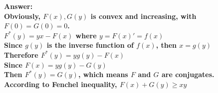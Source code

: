 \documentclass{article}
\theoremstyle{definition}
\theoremstyle{definition}
\theoremstyle{remark}
\begin{document}
{\bf{Answer:
\\Obviously, $F(x),G(y)$ is convex and increasing, with $F(0)=G(0)=0$.  
\\$F^*(y)=yx-F(x)$ where $y=F(x)'=f(x)$
\\Since $g(y)$ is the inverse function of $f(x)$, then $x=g(y)$
\\Therefore $F^*(y)=yg(y)-F(x)$ 
\\Since $F(x)=yg(y)-G(y)$
\\Then $F^*(y)=G(y)$, which means $F$ and $G$ are conjugates.
\\According to Fenchel inequality, $F(x)+G(y)\geq xy$
}}

\end{document}
